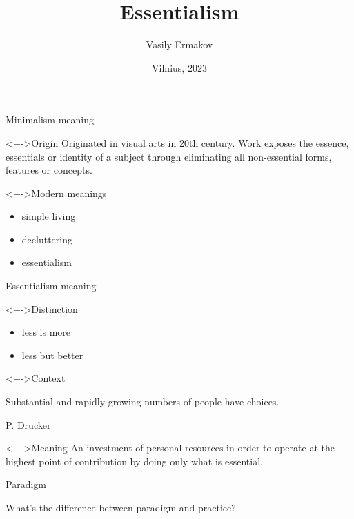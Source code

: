\documentclass{beamer}
\begin{document}
    \title{Essentialism}
    \author{Vasily Ermakov}
    \date{Vilnius, 2023}
    \frame{\titlepage}

    \begin{frame}{Minimalism meaning}
        \begin{block}
            <+->{Origin}
            Originated in visual arts in 20th century.
            Work exposes the essence, essentials or identity of a subject through eliminating all non-essential forms, features or concepts.
        \end{block}
        \begin{block}
            <+->{Modern meanings}
            \begin{itemize}
                \item simple living
                \item decluttering
                \item essentialism
            \end{itemize}
        \end{block}
    \end{frame}

    \begin{frame}{Essentialism meaning}
        \begin{block}
            <+->{Distinction}
            \begin{itemize}
                \item less is more
                \item less but better
            \end{itemize}
        \end{block}
        \begin{block}
            <+->{Context}
            \epigraph{Substantial and rapidly growing numbers of people have choices.}{P. Drucker}
        \end{block}
        \begin{block}
            <+->{Meaning}
            An investment of personal resources in order to operate at the highest point of contribution by doing only what is essential.
        \end{block}
    \end{frame}

    \begin{frame}{Paradigm}
        \begin{block}{}
            What's the difference between paradigm and practice?
        \end{block}
    \end{frame}
\end{document}
